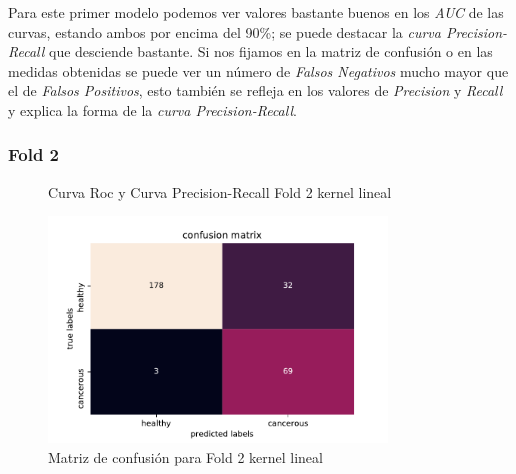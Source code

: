 Para este primer modelo podemos ver valores bastante buenos en los \textit{AUC} de las curvas, estando ambos por encima del 90\%; se puede destacar la \textit{curva Precision-Recall} que desciende bastante. Si nos fijamos en la matriz de confusión o en las medidas obtenidas se puede ver un número de \textit{Falsos Negativos} mucho mayor que el de \textit{Falsos Positivos}, esto también se refleja en los valores de \textit{Precision} y \textit{Recall} y explica la forma de la \textit{curva Precision-Recall}.

\subsubsection{Fold 2}

\begin{figure}[H]
	\centering
	\caption{Curva Roc y Curva Precision-Recall Fold 2 kernel lineal}
	\label{fig:resultados2_linear}
\end{figure}

\begin{figure}[H]
	\centering
	\includegraphics[width=90mm]{imagenes/confusion_mat2_gpflow_linear}
	\caption{Matriz de confusión para Fold 2 kernel lineal}
	\label{fig:conf2_lin}
\end{figure}

